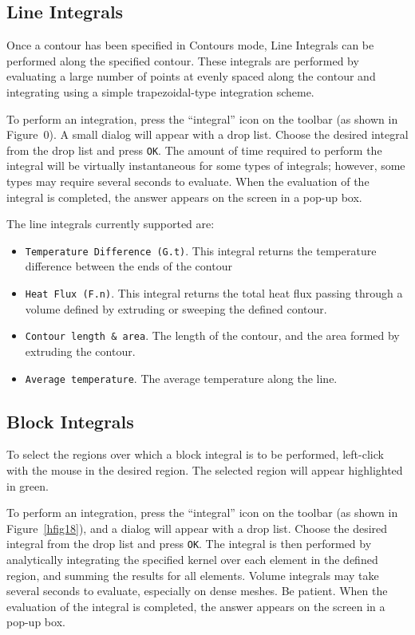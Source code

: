 \subsection{Line Integrals}

Once a contour has been specified in Contours mode, Line Integrals can be
performed along the specified contour. These integrals are performed by
evaluating a large number of points at evenly spaced along the contour and
integrating using a simple trapezoidal-type integration scheme.

To perform an integration, press the ``integral'' icon on the
toolbar (as shown in Figure~0). A small dialog will appear with a
drop list. Choose the desired integral from the drop list and press
\texttt{OK}. The amount of time required to perform the integral
will be virtually instantaneous for some types of integrals;
however, some types may require several seconds to evaluate. When
the evaluation of the integral is completed, the answer appears on
the screen in a pop-up box.

The line integrals currently supported are:


\begin{itemize}


\item \texttt{Temperature Difference (G.t)}. This integral returns the 
temperature difference between the ends of the contour

\item \texttt{Heat Flux (F.n)}. This integral returns the total heat flux passing through
a volume defined by extruding or sweeping the defined contour.

\item \texttt{Contour length \& area}. The length of the contour, and the area formed by
extruding the contour.

\item \texttt{Average temperature}. The average temperature along the line.
\end{itemize}



\subsection{Block Integrals}

To select the regions over which a block integral is to be performed,
left-click with the mouse in the desired region. The selected region will
appear highlighted in green.

To perform an integration, press the ``integral'' icon on the
toolbar (as shown in Figure~\ref{hfig18}), and a dialog will appear
with a drop list. Choose the desired integral from the drop list
and press \texttt{OK}. The integral is then performed by
analytically integrating the specified kernel over each element in
the defined region, and summing the results for all elements.
Volume integrals may take several seconds to evaluate, especially
on dense meshes. Be patient. When the evaluation of the integral is
completed, the answer appears on the screen in a pop-up box.

